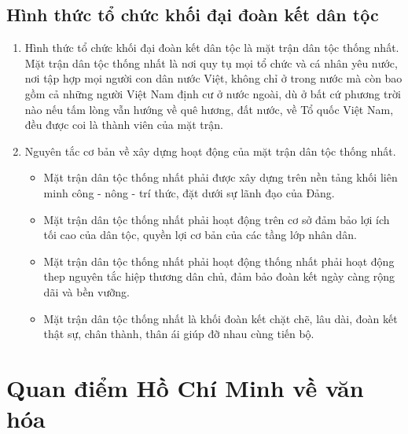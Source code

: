 \documentclass{article}
\begin{document}
	\subsection{Hình thức tổ chức khối đại đoàn kết dân tộc}
	\begin{enumerate}
		\item Hình thức tổ chức khối đại đoàn kết dân tộc là mặt trận dân tộc thống nhất.\\
		Mặt trận dân tộc thống nhất là nơi quy tụ mọi tổ chức và cá nhân yêu nước, nơi tập hợp mọi người con dân nước Việt, không chỉ ở trong nước mà còn bao gồm cả những người Việt Nam định cư ở nước ngoài, dù ở bất cứ phương trời nào nếu tấm lòng vẫn hướng về quê hương, đất nước, về Tổ quốc Việt Nam, đều được coi là thành viên của mặt trận.
		\item Nguyên tắc cơ bản về xây dựng hoạt động của mặt trận dân tộc thống nhất.
		\begin{itemize}
			\item Mặt trận dân tộc thống nhất phải được xây dựng trên nền tảng khối liên minh công - nông - trí thức, đặt dưới sự lãnh đạo của Đảng.
			\item Mặt trận dân tộc thống nhất phải hoạt động trên cơ sở đảm bảo lợi ích tối cao của dân tộc, quyền lợi cơ bản của các tầng lớp nhân dân.
			\item Mặt trận dân tộc thống nhất phải hoạt động thống nhất phải hoạt động thep nguyên tắc hiệp thương dân chủ, đảm bảo đoàn kết ngày càng rộng dãi và bền vưỡng.
			\item Mặt trận dân tộc thống nhất là khối đoàn kết chặt chẽ, lâu dài, đoàn kết thật sự, chân thành, thân ái giúp đỡ nhau cùng tiến bộ.
		\end{itemize}
	\end{enumerate}

	\section{Quan điểm Hồ Chí Minh về văn hóa}
\end{document}

